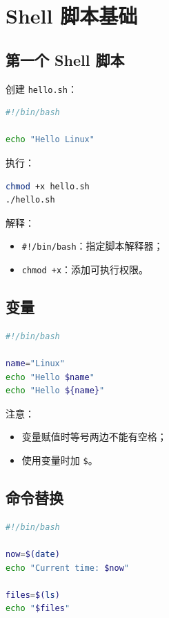 \documentclass[UTF8,a4paper,12pt]{ctexart}
\begin{document}
\section{Shell 脚本基础}

\subsection{第一个 Shell 脚本}

创建 \texttt{hello.sh}：

\begin{lstlisting}[language=bash]
#!/bin/bash

echo "Hello Linux"
\end{lstlisting}

执行：

\begin{lstlisting}[language=bash]
chmod +x hello.sh
./hello.sh
\end{lstlisting}

解释：
\begin{itemize}
    \item \texttt{\#!/bin/bash}：指定脚本解释器；
    \item \texttt{chmod +x}：添加可执行权限。
\end{itemize}

\subsection{变量}

\begin{lstlisting}[language=bash]
#!/bin/bash

name="Linux"
echo "Hello $name"
echo "Hello ${name}"
\end{lstlisting}

注意：
\begin{itemize}
    \item 变量赋值时等号两边不能有空格；
    \item 使用变量时加 \texttt{\$}。
\end{itemize}

\subsection{命令替换}

\begin{lstlisting}[language=bash]
#!/bin/bash

now=$(date)
echo "Current time: $now"

files=$(ls)
echo "$files"
\end{lstlisting}
\end{document}
